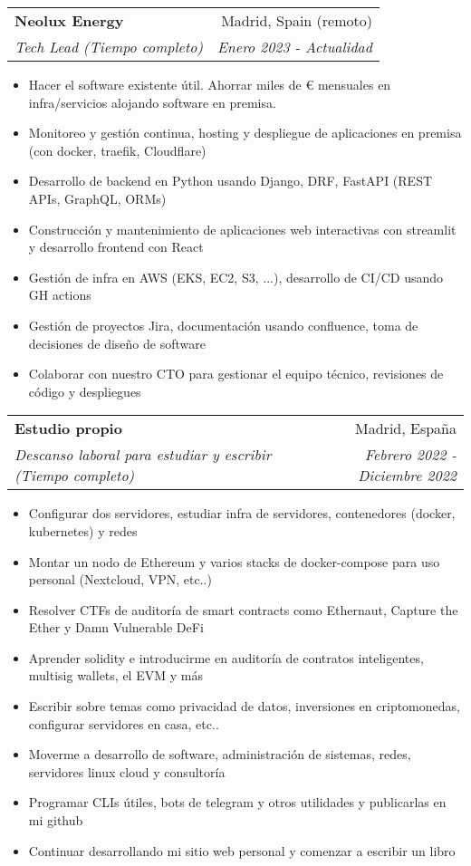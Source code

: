 \documentclass[a4paper,20pt]{article}
\makeatletter
\newcommand{\resumeSubheading}[4]{
  \vspace{-1pt}\item
    \begin{tabular*}{0.97\textwidth}{l@{\extracolsep{\fill}}r}
      \textbf{#1} & #2 \\
      \textit{#3} & \textit{#4} \\
    \end{tabular*}\vspace{-5pt}
}
\makeatother
\begin{document}
  \resumeSubheading{Neolux Energy}{Madrid, Spain (remoto)}
    {Tech Lead (Tiempo completo)}{Enero 2023 - Actualidad}
\begin{itemize} \itemsep-0.24em
  \item Hacer el software existente útil. Ahorrar miles de € mensuales en infra/servicios alojando software en premisa.
  \item Monitoreo y gestión continua, hosting y despliegue de aplicaciones en premisa (con docker, traefik, Cloudflare)
  \item Desarrollo de backend en Python usando Django, DRF, FastAPI (REST APIs, GraphQL, ORMs)
  \item Construcción y mantenimiento de aplicaciones web interactivas con streamlit y desarrollo frontend con React
  \item Gestión de infra en AWS (EKS, EC2, S3, ...), desarrollo de CI/CD usando GH actions
  \item Gestión de proyectos Jira, documentación usando confluence, toma de decisiones de diseño de software
  \item Colaborar con nuestro CTO para gestionar el equipo técnico, revisiones de código y despliegues
\end{itemize}
\vspace{-2pt}
  \resumeSubheading{Estudio propio}{Madrid, España}
    {Descanso laboral para estudiar y escribir (Tiempo completo)}{Febrero 2022 - Diciembre 2022}
\begin{itemize} \itemsep-0.24em
  \item Configurar dos servidores, estudiar infra de servidores, contenedores (docker, kubernetes) y redes
  \item Montar un nodo de Ethereum y varios stacks de docker-compose para uso personal (Nextcloud, VPN, etc..)
  \item Resolver CTFs de auditoría de smart contracts como Ethernaut, Capture the Ether y Damn Vulnerable DeFi
  \item Aprender solidity e introducirme en auditoría de contratos inteligentes, multisig wallets, el EVM y más
  \item Escribir sobre temas como privacidad de datos, inversiones en criptomonedas, configurar servidores en casa, etc..
  \item Moverme a desarrollo de software, administración de sistemas, redes, servidores linux cloud y consultoría
  \item Programar CLIs útiles, bots de telegram y otros utilidades y publicarlas en mi github
  \item Continuar desarrollando mi sitio web personal y comenzar a escribir un libro
\end{itemize}
\end{document}
